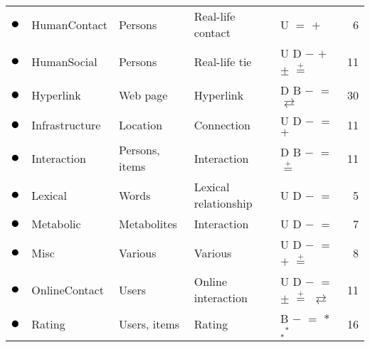 \begin{tabular}{lllllr}
\textcolor{colorHumanContact}{$\newmoon$} &HumanContact & Persons & Real-life contact & U \phantom{D} \phantom{B} \phantom{$-$} $=$ $+$ \phantom{$\pm$} \phantom{$\stackrel{+}{=}$} \phantom{$*$} \phantom{$_*{}^*$} \phantom{$\rightleftarrows$} \phantom{$++$}  &  6\\
\textcolor{colorHumanSocial}{$\newmoon$} &HumanSocial & Persons & Real-life tie & U D \phantom{B} $-$ \phantom{$=$} $+$ $\pm$ $\stackrel{+}{=}$ \phantom{$*$} \phantom{$_*{}^*$} \phantom{$\rightleftarrows$} \phantom{$++$}  &  11\\
\textcolor{colorHyperlink}{$\newmoon$} &Hyperlink & Web page & Hyperlink & \phantom{U} D B $-$ $=$ \phantom{$+$} \phantom{$\pm$} \phantom{$\stackrel{+}{=}$} \phantom{$*$} \phantom{$_*{}^*$} $\rightleftarrows$ \phantom{$++$}  &  30\\
\textcolor{colorInfrastructure}{$\newmoon$} &Infrastructure & Location & Connection & U D \phantom{B} $-$ $=$ $+$ \phantom{$\pm$} \phantom{$\stackrel{+}{=}$} \phantom{$*$} \phantom{$_*{}^*$} \phantom{$\rightleftarrows$} \phantom{$++$}  &  11\\
\textcolor{colorInteraction}{$\newmoon$} &Interaction & Persons, items & Interaction & \phantom{U} D B $-$ $=$ \phantom{$+$} \phantom{$\pm$} $\stackrel{+}{=}$ \phantom{$*$} \phantom{$_*{}^*$} \phantom{$\rightleftarrows$} \phantom{$++$}  &  11\\
\textcolor{colorLexical}{$\newmoon$} &Lexical & Words & Lexical relationship & U D \phantom{B} $-$ $=$ \phantom{$+$} \phantom{$\pm$} \phantom{$\stackrel{+}{=}$} \phantom{$*$} \phantom{$_*{}^*$} \phantom{$\rightleftarrows$} \phantom{$++$}  &  5\\
\textcolor{colorMetabolic}{$\newmoon$} &Metabolic & Metabolites & Interaction & U D \phantom{B} $-$ $=$ \phantom{$+$} \phantom{$\pm$} \phantom{$\stackrel{+}{=}$} \phantom{$*$} \phantom{$_*{}^*$} \phantom{$\rightleftarrows$} \phantom{$++$}  &  7\\
\textcolor{colorMisc}{$\newmoon$} &Misc & Various & Various & U D \phantom{B} $-$ $=$ $+$ \phantom{$\pm$} $\stackrel{+}{=}$ \phantom{$*$} \phantom{$_*{}^*$} \phantom{$\rightleftarrows$} \phantom{$++$}  &  8\\
\textcolor{colorOnlineContact}{$\newmoon$} &OnlineContact & Users & Online interaction & U D \phantom{B} $-$ $=$ \phantom{$+$} $\pm$ $\stackrel{+}{=}$ \phantom{$*$} \phantom{$_*{}^*$} $\rightleftarrows$ \phantom{$++$}  &  11\\
\textcolor{colorRating}{$\newmoon$} &Rating & Users, items & Rating & \phantom{U} \phantom{D} B $-$ $=$ \phantom{$+$} \phantom{$\pm$} \phantom{$\stackrel{+}{=}$} $*$ $_*{}^*$ \phantom{$\rightleftarrows$} \phantom{$++$}  &  16\\

\end{tabular}
